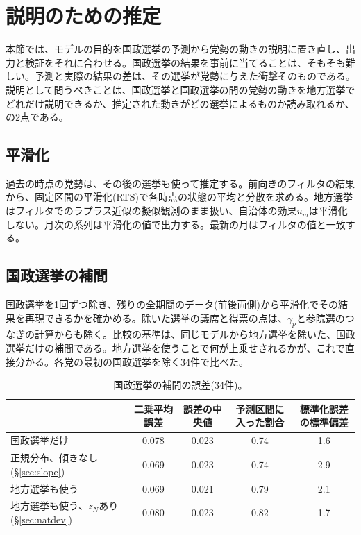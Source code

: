 \documentclass[a4paper,11pt]{ltjsarticle}
\begin{document}
\section{説明のための推定}
\label{sec:explain}

本節では、モデルの目的を国政選挙の予測から党勢の動きの説明に置き直し、出力と検証をそれに合わせる。国政選挙の結果を事前に当てることは、そもそも難しい。予測と実際の結果の差は、その選挙が党勢に与えた衝撃そのものである。説明として問うべきことは、国政選挙と国政選挙の間の党勢の動きを地方選挙でどれだけ説明できるか、推定された動きがどの選挙によるものか読み取れるか、の2点である。

\subsection{平滑化}

過去の時点の党勢は、その後の選挙も使って推定する。前向きのフィルタの結果から、固定区間の平滑化(RTS)で各時点の状態の平均と分散を求める。地方選挙はフィルタでのラプラス近似の擬似観測のまま扱い、自治体の効果$u_m$は平滑化しない。月次の系列は平滑化の値で出力する。最新の月はフィルタの値と一致する。

\subsection{国政選挙の補間}

国政選挙を1回ずつ除き、残りの全期間のデータ(前後両側)から平滑化でその結果を再現できるかを確かめる。除いた選挙の議席と得票の点は、$\gamma_p$と参院選のつなぎの計算からも除く。比較の基準は、同じモデルから地方選挙を除いた、国政選挙だけの補間である。地方選挙を使うことで何が上乗せされるかが、これで直接分かる。各党の最初の国政選挙を除く34件で比べた。

\begin{table}[h]
\centering
\begin{tabular}{lcccc}
\hline
 & 二乗平均誤差 & 誤差の中央値 & 予測区間に入った割合 & 標準化誤差の標準偏差 \\
\hline
国政選挙だけ & 0.078 & 0.023 & 0.74 & 1.6 \\
正規分布、傾きなし(\S\ref{sec:slope}) & 0.069 & 0.023 & 0.74 & 2.9 \\
地方選挙も使う & 0.069 & 0.021 & 0.79 & 2.1 \\
地方選挙も使う、$z_N$あり(\S\ref{sec:natdev}) & 0.080 & 0.023 & 0.82 & 1.7 \\
\hline
\end{tabular}
\caption{国政選挙の補間の誤差(34件)。}
\end{table}
\end{document}

